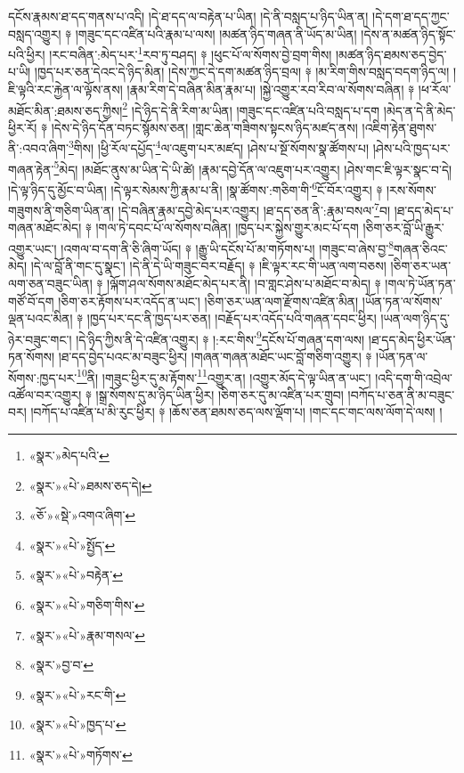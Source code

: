 དངོས་རྣམས་ཐ་དད་གནས་པ་འདི། །དེ་ཐ་དད་ལ་བརྟེན་པ་ཡིན། །དེ་ནི་བསླད་པ་ཉིད་ཡིན་ན། །དེ་དག་ཐ་དད་ཀྱང་བསླད་འགྱུར། ༈ །གཟུང་དང་འཛིན་པའི་རྣམ་པ་ལས། །མཚན་ཉིད་གཞན་ནི་ཡོད་མ་ཡིན། །དེས་ན་མཚན་ཉིད་སྟོང་པའི་ཕྱིར། །རང་བཞིན་:མེད་པར་\footnote{«སྣར་»མེད་པའི་}རབ་ཏུ་བཤད། ༈ །ཕུང་པོ་ལ་སོགས་བྱེ་བྲག་གིས། །མཚན་ཉིད་ཐམས་ཅད་བྱེད་པ་ཡི། །ཁྱད་པར་ཅན་དེའང་དེ་ཉིད་མིན། །དེས་ཀྱང་དེ་དག་མཚན་ཉིད་བྲལ། ༈ །མ་རིག་གིས་བསླད་བདག་ཉིད་ལ། །ཇི་ལྟའི་རང་རྐྱེན་ལ་ལྟོས་ནས། །རྣམ་རིག་དེ་བཞིན་མིན་རྣམ་པ། །སྐྱེ་འགྱུར་རབ་རིབ་ལ་སོགས་བཞིན། ༈ །ཕ་རོལ་མཐོང་མིན་:ཐམས་ཅད་ཀྱིས།\footnote{«སྣར་»«པེ་»ཐམས་ཅད་དེ།} །དེ་ཉིད་དེ་ནི་རིག་མ་ཡིན། །གཟུང་དང་འཛིན་པའི་བསླད་པ་དག །མེད་ན་དེ་ནི་མེད་ཕྱིར་རོ། ༈ །དེས་དེ་ཉིད་དོན་བཏང་སྙོམས་ཅན། །གླང་ཆེན་གཟིགས་སྟངས་ཉིད་མཛད་ནས། །འཇིག་རྟེན་ཐུགས་ནི་:འབའ་ཞིག་\footnote{«ཅོ་»«སྡེ་»འགའ་ཞིག་}གིས། །ཕྱི་རོལ་དཔྱོད་\footnote{«སྣར་»«པེ་»སྤྱོད་}ལ་འཇུག་པར་མཛད། །ཤེས་པ་སྔོ་སོགས་སྣ་ཚོགས་པ། །ཤེས་པའི་ཁྱད་པར་གཞན་རྟེན་\footnote{«སྣར་»«པེ་»བརྟེན་}མེད། །མཐོང་ནུས་མ་ཡིན་དེ་ཡི་ཚེ། །རྣམ་དབྱེ་དོན་ལ་འཇུག་པར་འགྱུར། །ཤེས་གང་ཇི་ལྟར་སྣང་བ་དེ། །དེ་ལྟ་ཉིད་དུ་མྱོང་བ་ཡིན། །དེ་ལྟར་སེམས་ཀྱི་རྣམ་པ་ནི། །སྣ་ཚོགས་:གཅིག་གི་\footnote{«སྣར་»«པེ་»གཅིག་གིས་}ངོ་བོར་འགྱུར། ༈ །རས་སོགས་གཟུགས་ནི་གཅིག་ཡིན་ན། །དེ་བཞིན་རྣམ་དབྱེ་མེད་པར་འགྱུར། །ཐ་དད་ཅན་ནི་:རྣམ་བསལ་\footnote{«སྣར་»«པེ་»རྣམ་གསལ་}བ། །ཐ་དད་མེད་པ་གཞན་མཐོང་མེད། ༈ །གལ་ཏེ་དབང་པོ་ལ་སོགས་བཞིན། །ཁྱད་པར་སྐྱེས་གྱུར་མང་པོ་དག །ཅིག་ཅར་བློ་ཡི་རྒྱུར་འགྱུར་ཡང་། །འགལ་བ་དག་ནི་ཅི་ཞིག་ཡོད། ༈ །རྒྱུ་ཡི་དངོས་པོ་མ་གཏོགས་པ། །གཟུང་བ་ཞེས་བྱ་\footnote{«སྣར་»བྱ་བ་}གཞན་ཅིའང་མེད། །དེ་ལ་བློ་ནི་གང་དུ་སྣང་། །དེ་ནི་དེ་ཡི་གཟུང་བར་བརྗོད། ༈ །ཇི་ལྟར་རང་གི་ཡན་ལག་བཅས། །ཅིག་ཅར་ཡན་ལག་ཅན་བཟུང་ཡིན། ༈ །ལྐོག་ཤལ་སོགས་མཐོང་མེད་པར་ནི། །བ་གླང་ཤེས་པ་མཐོང་བ་མེད། ༈ །གལ་ཏེ་ཡོན་ཏན་གཙོ་བོ་དག །ཅིག་ཅར་རྟོགས་པར་འདོད་ན་ཡང་། །ཅིག་ཅར་ཡན་ལག་རྫོགས་འཛིན་མིན། །ཡོན་ཏན་ལ་སོགས་ལྡན་པའང་མིན། ༈ །ཁྱད་པར་དང་ནི་ཁྱད་པར་ཅན། །བརྗོད་པར་འདོད་པའི་གཞན་དབང་ཕྱིར། །ཡན་ལག་ཉིད་དུ་ཉེར་བཟུང་གང་། །དེ་ཉིད་ཀྱིས་ནི་དེ་འཛིན་འགྱུར། ༈ །:རང་གིས་\footnote{«སྣར་»«པེ་»རང་གི་}དངོས་པོ་གཞན་དག་ལས། །ཐ་དད་མེད་ཕྱིར་ཡོན་ཏན་སོགས། །ཐ་དད་བྱེད་པའང་མ་བཟུང་ཕྱིར། །གཞན་གཞན་མཐོང་ཡང་བློ་གཅིག་འགྱུར། ༈ །ཡོན་ཏན་ལ་སོགས་:ཁྱད་པར་\footnote{«སྣར་»«པེ་»ཁྱད་པ་}ནི། །གཟུང་ཕྱིར་དུ་མ་རྟོགས་\footnote{«སྣར་»«པེ་»གཏོགས་}འགྱུར་ན། །འགྱུར་མོད་དེ་ལྟ་ཡིན་ན་ཡང་། །འདི་དག་གི་འབྲེལ་འཚོལ་བར་འགྱུར། ༈ །སྒྲ་སོགས་དུ་མ་ཉིད་ཡིན་ཕྱིར། །ཅིག་ཅར་དུ་མ་འཛིན་པར་གྲུབ། །བཀོད་པ་ཅན་ནི་མ་བཟུང་བར། །བཀོད་པ་འཛིན་པ་མི་རུང་ཕྱིར། ༈ །ཆོས་ཅན་ཐམས་ཅད་ལས་ལྡོག་པ། །གང་དང་གང་ལས་ལོག་དེ་ལས། །
